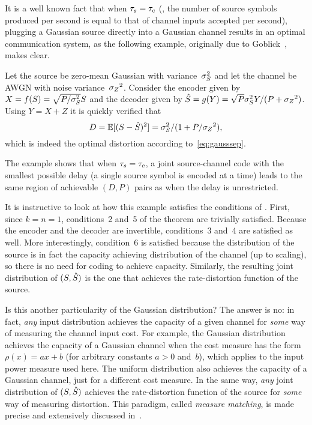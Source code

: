 It is a well known fact that when ${\tau_s} = {\tau_c}$ (\ie, the number of source symbols
produced per second is equal to that of channel inputs accepted per second),
plugging a Gaussian source directly into a Gaussian channel results in an
optimal communication system, as the following example, originally due to
Goblick~\cite{Goblick1965}, makes clear.

\begin{example}
  \label{ex:gausssingle}
  Let the source be zero-mean Gaussian with variance~${\sigma_S^2}$ and let the channel
  be AWGN with noise variance~${{\sigma_Z}^2}$. Consider the encoder given by $X =
  f(S) = \sqrt{P/{\sigma_S^2}} S$ and the decoder given by ${\hat{S}} = g(Y) = \sqrt{P}
  {\sigma_S^2} Y / (P + {{\sigma_Z}^2})$. Using $Y = X + Z$ it is quickly verified that
  \begin{equation*}
    D = \mathbb{E}[(S - {\hat{S}})^2] = {\sigma_S^2} / (1 + P/{{\sigma_Z}^2}),
  \end{equation*}
  which is indeed the optimal distortion according to~\eqref{eq:gausssep}.
\end{example}

The example shows that when ${\tau_s} = {\tau_c}$, a joint source-channel code with the
smallest possible delay (a single source symbol is encoded at a time) leads to
the same region of achievable $(D,P)$ pairs as when the delay is unrestricted.

It is instructive to look at how this example satisfies the conditions of
. First, since $k = n = 1$, conditions~2 and~5 of
the theorem are trivially satisfied. Because the encoder and the decoder are
invertible, conditions~3 and~4 are satisfied as well. More interestingly,
condition~6 is satisfied because the distribution of the source is in fact the
capacity achieving distribution of the channel (up to scaling), so there is no
need for coding to achieve capacity. Similarly, the resulting joint distribution
of $(S, {\hat{S}})$ is the one that achieves the rate-distortion function of the
source.

Is this another particularity of the Gaussian distribution? The answer is no: in
fact, \emph{any} input distribution achieves the capacity of a given channel for
\emph{some} way of measuring the channel input cost. For example, the Gaussian
distribution achieves the capacity of a Gaussian channel when the cost
measure has the form $\rho(x) = ax + b$ (for arbitrary constants $a > 0$
and~$b$), which applies to the input power measure used here. The uniform
distribution also achieves the capacity of a Gaussian channel, just for a
different cost measure. In the same way, \emph{any} joint distribution of $(S,
{\hat{S}})$ achieves the rate-distortion function of the source for \emph{some} way of
measuring distortion. This paradigm, called \emph{measure matching}, is made
precise and extensively discussed in~\cite{GastparRV2003}.


